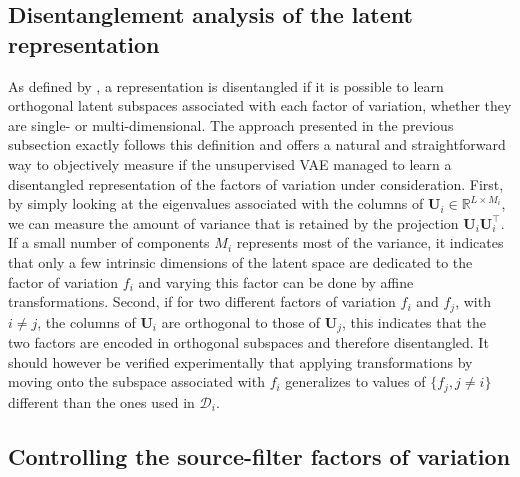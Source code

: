 \documentclass[review]{elsarticle}
\begin{document}
\subsection{Disentanglement analysis of the latent representation}
\label{subsec:orthogonality}

As defined by \cite{higgins2018towards}, a representation is disentangled if it is possible to learn orthogonal latent subspaces associated with each factor of variation, whether they are single- or multi-dimensional. The approach presented in the previous subsection exactly follows this definition and offers a natural and straightforward way to objectively measure if the unsupervised VAE managed to learn a disentangled representation of the factors of variation under consideration. First, by simply looking at the eigenvalues associated with the columns of $\mathbf{U}_i \in \mathbb{R}^{L \times M_i}$, we can measure the amount of variance that is retained by the projection $\mathbf{U}_i \mathbf{U}_i^\top$. If a small number of components $M_i$ represents most of the variance, it indicates that only a few intrinsic dimensions of the latent space are dedicated to the factor of variation $f_i$ and varying this factor can be done by affine transformations. Second, if for two different factors of variation $f_i$ and $f_j$, with $i\neq j$, the columns of $\mathbf{U}_i$ are orthogonal to those of $\mathbf{U}_j$, this indicates that the two factors are encoded in orthogonal subspaces and therefore disentangled. It should however be verified experimentally that applying transformations by moving onto the subspace associated with $f_i$ generalizes to values of $\{f_j, j \neq i\}$ different than the ones used in $\mathcal{D}_i$.  

\subsection{Controlling the source-filter factors of variation}
\label{subsec:control_factor}
\end{document}
